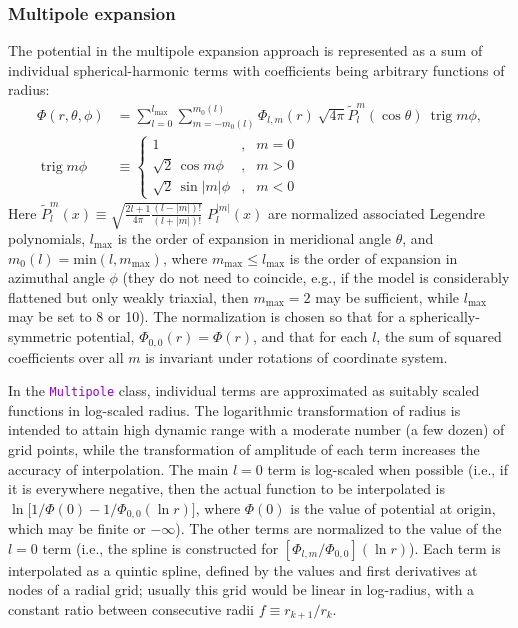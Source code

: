 \documentclass[12pt]{article}
\newcommand{\ttt}[1]{\textcolor{darkviolet}{\texttt{#1}}}
\DeclareMathOperator{\trig}{trig}
\begin{document}

\subsubsection{Multipole expansion}  \label{sec:PotentialMultipoleDetails}

The potential in the multipole expansion approach is represented as a sum of individual spherical-harmonic terms with coefficients being arbitrary functions of radius:
\begin{align}
\Phi(r,\theta,\phi) &= \sum_{l=0}^{l_\mathrm{max}}\sum_{m=-m_0(l)}^{m_0(l)}
\Phi_{l,m}(r)\: \sqrt{4\pi} \tilde P_l^m(\cos\theta)\:\trig m\phi, \\
\trig m\phi &\equiv \left\{\begin{array}{rcl} 
  1 &,& m=0 \\
  \sqrt{2}\,\cos  m \phi &,& m > 0 \\
  \sqrt{2}\,\sin |m|\phi &,& m < 0 
\end{array}\right.   \nonumber
\end{align}
Here $\tilde P_l^m(x) \equiv \sqrt{\frac{2l+1}{4\pi}\frac{(l-|m|)!}{(l+|m|)!}} \;P_l^{|m|}(x)$ 
are normalized associated Legendre polynomials, $l_\mathrm{max}$ is the order of expansion in meridional angle $\theta$, and $m_0(l) = \mathrm{min}(l, m_\mathrm{max})$, where $m_\mathrm{max} \le l_\mathrm{max}$ is the order of expansion in azimuthal angle $\phi$ (they do not need to coincide, e.g., if the model is considerably flattened but only weakly triaxial, then $m_\mathrm{max}=2$ may be sufficient, while $l_\mathrm{max}$ may be set to 8 or 10). The normalization is chosen so that for a spherically-symmetric potential, $\Phi_{0,0}(r)=\Phi(r)$, and that for each $l$, the sum of squared coefficients over all $m$ is invariant under rotations of coordinate system.

In the \ttt{Multipole} class, individual terms are approximated as suitably scaled functions in log-scaled radius. The logarithmic transformation of radius is intended to attain high dynamic range with a moderate number (a few dozen) of grid points, while the transformation of amplitude of each term increases the accuracy of interpolation. The main $l=0$ term is log-scaled when possible (i.e., if it is everywhere negative, then the actual function to be interpolated is $\ln\big[1/\Phi(0)-1/\Phi_{0,0}(\ln r)\big]$, where $\Phi(0)$ is the value of potential at origin, which may be finite or $-\infty$). The other terms are normalized to the value of the $l=0$ term (i.e., the spline is constructed for $[\Phi_{l,m}/\Phi_{0,0}](\ln r)$). Each term is interpolated as a quintic spline, defined by the values and first derivatives at nodes of a radial grid; usually this grid would be linear in log-radius, with a constant ratio between consecutive radii $f\equiv r_{k+1}/r_k$.
\end{document}
